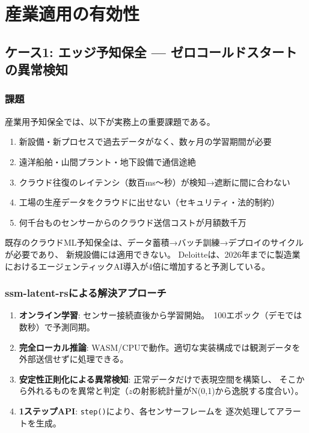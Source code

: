 \documentclass[11pt,a4paper]{ltjsarticle}
\begin{document}
\section{産業適用の有効性}

\subsection{ケース1: エッジ予知保全 --- ゼロコールドスタートの異常検知}

\subsubsection{課題}

産業用予知保全では、以下が実務上の重要課題である。

\begin{enumerate}
  \item 新設備・新プロセスで過去データがなく、数ヶ月の学習期間が必要
  \item 遠洋船舶・山間プラント・地下設備で通信途絶
  \item クラウド往復のレイテンシ（数百ms〜秒）が検知→遮断に間に合わない
  \item 工場の生産データをクラウドに出せない（セキュリティ・法的制約）
  \item 何千台ものセンサーからのクラウド送信コストが月額数千万
\end{enumerate}

既存のクラウドML予知保全は、データ蓄積→バッチ訓練→デプロイのサイクルが必要であり、
新規設備には適用できない。
Deloitteは、2026年までに製造業におけるエージェンティックAI導入が4倍に増加すると予測している\cite{oxmaint2026smartfactory}。

\subsubsection{ssm-latent-rsによる解決アプローチ}

\begin{enumerate}
  \item \textbf{オンライン学習}: センサー接続直後から学習開始。~100エポック（デモでは数秒）で予測同期。
  \item \textbf{完全ローカル推論}: WASM/CPUで動作。適切な実装構成では観測データを外部送信せずに処理できる。
  \item \textbf{安定性正則化による異常検知}: 正常データだけで表現空間を構築し、
    そこから外れるものを異常と判定（$z$の射影統計量がN(0,1)から逸脱する度合い）。
  \item \textbf{1ステップAPI}: \texttt{step()}により、各センサーフレームを
    逐次処理してアラートを生成。
\end{enumerate}
\end{document}
